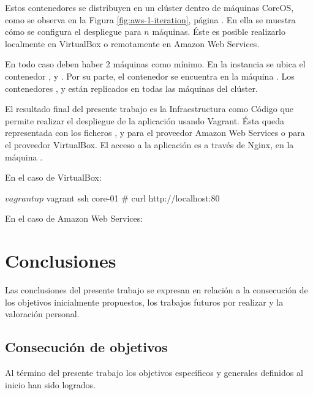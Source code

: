 Estos contenedores se distribuyen en un clúster dentro de máquinas CoreOS, como se observa en la Figura \ref{fig:aws-1-iteration}, página \pageref{fig:aws-1-iteration}. En ella se muestra cómo se configura el despliegue para $n$ máquinas. Éste es posible realizarlo localmente en VirtualBox o remotamente en Amazon Web Services. 

En todo caso deben haber 2 máquinas como mínimo. En la instancia  se ubica el contenedor ,  y . Por su parte, el contenedor  se encuentra en la máquina . Los contenedores ,  y  están replicados en todas las máquinas del clúster. 

El resultado final del presente trabajo es la Infraestructura como Código que permite realizar el despliegue de la aplicación usando Vagrant. Ésta queda representada con los ficheros ,  y  para el proveedor Amazon Web Services o  para el proveedor VirtualBox. El acceso a la aplicación es a través de Nginx, en la máquina .

En el caso de VirtualBox:

\begin{code}
$ vagrant up
$ vagrant ssh core-01
# curl http://localhost:80
\end{code}

En el caso de Amazon Web Services:


\section{Conclusiones}

Las conclusiones del presente trabajo se expresan en relación a la consecución de los objetivos inicialmente propuestos, los trabajos futuros por realizar y la valoración personal.

\subsection{Consecución de objetivos}

Al término del presente trabajo los objetivos específicos y generales definidos al inicio han sido logrados. 

